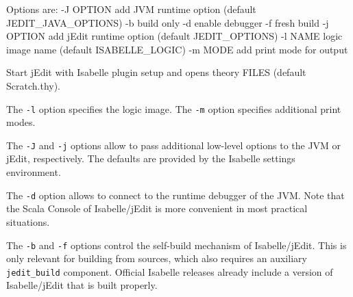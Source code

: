 \begin{isabellebody}
\begin{isamarkuptext}
\begin{ttbox}
  Options are:
    -J OPTION    add JVM runtime option (default JEDIT_JAVA_OPTIONS)
    -b           build only
    -d           enable debugger
    -f           fresh build
    -j OPTION    add jEdit runtime option (default JEDIT_OPTIONS)
    -l NAME      logic image name (default ISABELLE_LOGIC)
    -m MODE      add print mode for output

Start jEdit with Isabelle plugin setup and opens theory FILES
(default Scratch.thy).
\end{ttbox}

The \verb|-l| option specifies the logic image.  The
\verb|-m| option specifies additional print modes.

The \verb|-J| and \verb|-j| options allow to pass
additional low-level options to the JVM or jEdit, respectively.  The
defaults are provided by the Isabelle settings environment.

The \verb|-d| option allows to connect to the runtime debugger
of the JVM.  Note that the Scala Console of Isabelle/jEdit is more
convenient in most practical situations.

The \verb|-b| and \verb|-f| options control the
self-build mechanism of Isabelle/jEdit.  This is only relevant for
building from sources, which also requires an auxiliary \verb|jedit_build| component.  Official Isabelle releases already include a
version of Isabelle/jEdit that is built properly.%
\end{isamarkuptext}%
\isamarkuptrue%
%
\isadelimtheory
%
\endisadelimtheory
%
\isatagtheory
{}\isamarkupfalse%
%
\endisatagtheory
{\isafoldtheory}%
%
\isadelimtheory
%
\endisadelimtheory
\end{isabellebody}%
